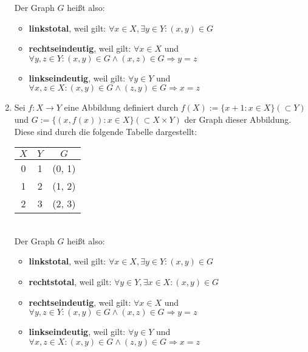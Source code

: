 \begin{enumerate}
        Der Graph $G$ hei{\ss}t also:
        \begin{itemize}
            \item \textbf{linkstotal}, weil gilt: $\forall x \in X, \exists y \in Y : (x, y) \in G$
            \item \textbf{rechtseindeutig}, weil gilt: $\forall x \in X$ und $\forall y,z \in Y : (x, y) \in G \land (x, z) \in G \Rightarrow y = z$
            \item \textbf{linkseindeutig}, weil gilt: $\forall y \in Y$ und $\forall x,z \in X : (x, y) \in G \land (z, y) \in G \Rightarrow x = z$
        \end{itemize}
    \item Sei $f: X \rightarrow Y$ eine Abbildung definiert durch $f(X) :=
        \{x + 1 : x \in X\} (\subset Y)$ und $G := \{(x, f(x)) : x \in X\}
        (\subset X \times Y)$ der Graph dieser Abbildung. Diese sind durch die
        folgende Tabelle dargestellt:
        \begin{table*}[h]
            \centering
            \begin{tabular}{c|c|c}
                $X$ & $Y$ & $G$ \\
                \hline
                0  & 1 & (0,  1) \\
                1  & 2 & (1,  2) \\
                2  & 3 & (2,  3) \\
            \end{tabular}
        \end{table*} \\
        Der Graph $G$ hei{\ss}t also:
        \begin{itemize}
            \item \textbf{linkstotal}, weil gilt: $\forall x \in X, \exists y \in Y : (x, y) \in G$
            \item \textbf{rechtstotal}, weil gilt: $\forall y \in Y, \exists x \in X: (x, y) \in G$
            \item \textbf{rechtseindeutig}, weil gilt: $\forall x \in X$ und $\forall y,z \in Y : (x, y) \in G \land (x, z) \in G \Rightarrow y = z$
            \item \textbf{linkseindeutig}, weil gilt: $\forall y \in Y$ und $\forall x,z \in X : (x, y) \in G \land (z, y) \in G \Rightarrow x = z$
        \end{itemize}
\end{enumerate}

